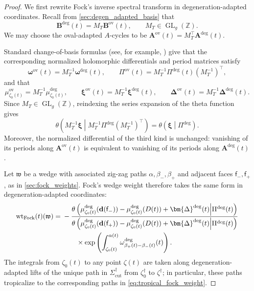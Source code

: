 \documentclass[12pt]{amsart}
\numberwithin{equation}{section}
\theoremstyle{definition}
\newcommand{\Z}{\mathbb{Z}}
\newcommand{\wt}{\mathrm{wt}}
\def\divisor{D}
\def\trop{\dagger}
\def\bface{\mathsf{f}}
\def\dam{{\bf d}}
\def\divisor{D}
\def\vecRC{\bm{\Delta}}
\def\vecptjac{\bm{\xi}}
\def\ptCg{\vecptjac}
\def\ptSig{\zeta}
\def\basept{{\ptSig_0}}
\def\baseptT{{\ptSig_0^\trop}}
\def\mcurve{\Sigma}
\def\tropmcurve{\mcurve^\trop}
\begin{document}
\begin{proof}

We first rewrite Fock's inverse spectral transform in
degeneration-adapted coordinates.  Recall from \cref{sec:degen_adapted_basis} that
\[
\bm B^{\mathrm{deg}}(t)
=
M_T\bm B^{\mathrm{ov}}(t), \qquad M_T \in \operatorname{GL}_{g}(\Z).
\]
We may choose the oval-adapted $A$-cycles to be $\bm A^{\mathrm{ov}}(t)
=
M_T^\top\bm A^{\mathrm{deg}}(t)$. 

Standard change-of-basis formulas (see, for example, \cite{Fay}) give that the corresponding normalized holomorphic differentials and period
matrices satisfy
\[
\bm\omega^{\mathrm{ov}}(t)
=
M_T^{-1}\bm\omega^{\mathrm{deg}}(t),
\qquad
\Pi^{\mathrm{ov}}(t)
=
M_T^{-1}
\Pi^{\mathrm{deg}}(t)
(M_T^{-1})^{\top},
\]
and that
\[
\mu_{\basept(t)}^{\mathrm{ov}}
=
M_T^{-1}
\mu_{\basept(t)}^{\mathrm{deg}},
\qquad
\vecptjac^{\mathrm{ov}}(t)
=
M_T^{-1}
\vecptjac^{\mathrm{deg}}(t),
\qquad
\vecRC^{\mathrm{ov}}(t)
=
M_T^{-1}
\vecRC^{\mathrm{deg}}(t).
\]
Since $M_T\in\operatorname{GL}_g(\Z)$, reindexing the series expansion
of the theta function gives
\[
\theta
\left(
M_T^{-1}\ptCg
\middle|
M_T^{-1}\Pi^{\mathrm{deg}}(M_T^{-1})^\top
\right)
=
\theta
\left(
\ptCg
\middle|
\Pi^{\mathrm{deg}}
\right).
\]
Moreover, the normalized differential of the third kind is unchanged:
vanishing of its periods along $\bm A^{\mathrm{ov}}(t)$ is equivalent to vanishing of its periods along
$\bm A^{\mathrm{deg}}(t)$.

Let $\mathfrak w$ be a wedge with associated zig-zag paths
$\alpha,\beta_-,\beta_+$ and adjacent faces
$\bface_-,\bface_+$, as in \cref{sec:fock_weights}.  Fock's wedge
weight therefore takes the same form in degeneration-adapted
coordinates:
\begin{equation}
\label{eq:fock_wedge_deg}
\begin{aligned}
\wt_{\mathrm{Fock}}(t)(\mathfrak w)
={}&
-\frac{
\theta\left(
\mu_{\basept(t)}^{\mathrm{deg}}(\dam(\bface_-))
-\mu^{\mathrm{deg}}_{\basept(t)}(\divisor(t))
+\vecRC^{\mathrm{deg}}(t)
\middle|
\Pi^{\mathrm{deg}}(t)
\right)
}{
\theta\left(
\mu_{\basept(t)}^{\mathrm{deg}}(\dam(\bface_+))
-\mu^{\mathrm{deg}}_{\basept(t)}(\divisor(t))
+\vecRC^{\mathrm{deg}}(t)
\middle|
\Pi^{\mathrm{deg}}(t)
\right)
}
\\
&\qquad\times
\exp\left(
\int_{\basept(t)}^{\alpha(t)}
\omega^{\mathrm{deg}}_{\beta_+(t)-\beta_-(t)}(t)
\right).
\end{aligned}
\end{equation}
The integrals from $\basept(t)$ to any point $\ptSig(t)$ are taken along degeneration-adapted lifts of the unique path in $\tropmcurve_{\mathrm{cut}}$ from $\baseptT$ to $\ptSig^\trop$; in particular, these paths tropicalize to the corresponding paths in \eqref{eq:tropical_fock_weight}.



\end{proof}
\end{document}
